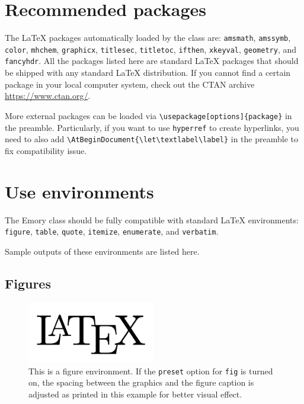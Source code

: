 \documentclass[final]{emory}
\begin{document}
\section{Recommended packages}
The \LaTeX{} packages automatically loaded by the class are: \Verb|amsmath|, 
\Verb|amssymb|, \Verb|color|, \Verb|mhchem|, \Verb|graphicx|, \Verb|titlesec|, 
\Verb|titletoc|, \Verb|ifthen|, \Verb|xkeyval|, \Verb|geometry|, and 
\Verb|fancyhdr|. All the packages listed here are standard \LaTeX{} packages 
that should be shipped with any standard \LaTeX{} distribution. If you cannot 
find a certain package in your local computer system, check out the CTAN 
archive \url{https://www.ctan.org/}.

More external packages can be loaded via \Verb|\usepackage[options]{package}|
in the preamble. Particularly, if you want to use \Verb|hyperref| to create hyperlinks, you need to also add \Verb|\AtBeginDocument{\let\textlabel\label}| in the preamble to fix compatibility issue. 


\section{Use environments}\label{sec:env}
The Emory class should be fully compatible with standard \LaTeX{} environments:
\Verb|figure|, \Verb|table|, \Verb|quote|, \Verb|itemize|, \Verb|enumerate|,
and \Verb|verbatim|.

Sample outputs of these environments are listed here. 

\subsection{Figures}

\begin{figure}[htp!]
  \centering
  \includegraphics[width=0.5\textwidth]{LaTeXLogo.png}
  \caption[This is a figure environment]{This is a figure 
  environment.\label{fig} If the \protect\Verb|preset| option 
  for \protect\Verb|fig| is turned on, the spacing between the graphics and the 
  figure caption is adjusted as printed in this example for better visual 
  effect.}
\end{figure}
\end{document}
